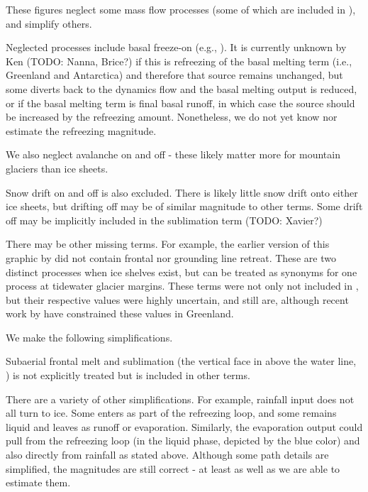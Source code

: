 \documentclass[jog]{igs}
\begin{document}
These figures neglect some mass flow processes (some of which are included in \citet[Fig. 2]{cogley_2011}), and simplify others.

Neglected processes include basal freeze-on (e.g., \citet{bell_2014}). It is currently unknown by Ken (TODO: Nanna,  Brice?) if this is refreezing of the basal melting term (i.e., \citet{karlsson_2021} Greenland and \citet{pattyn_2010} Antarctica) and therefore that source remains unchanged, but some diverts back to the dynamics flow and the basal melting output is reduced, or if the basal melting term is final basal runoff, in which case the source should be increased by the refreezing amount. Nonetheless, we do not yet know nor estimate the refreezing magnitude.

We also neglect avalanche on and off - these likely matter more for mountain glaciers than ice sheets.

Snow drift on and off is also excluded. There is likely little snow drift onto either ice sheets, but drifting off may be of similar magnitude to other terms. Some drift off may be implicitly included in the sublimation term (TODO: Xavier?)

There may be other missing terms. For example, the earlier version of this graphic by \citet[Fig. 2]{cogley_2011} did not contain frontal nor grounding line retreat. These are two distinct processes when ice shelves exist, but can be treated as synonyms for one process at tidewater glacier margins. These terms were not only not included in \citet{cogley_2011}, but their respective values were highly uncertain, and still are, although recent work by \citet{kochtitzky_2023,greene_2024} have constrained these values in Greenland. 

We make the following simplifications.

Subaerial frontal melt and sublimation (the vertical face in above the water line, \citet[Fig. 2]{cogley_2011}) is not explicitly treated but is included in other terms.

There are a variety of other simplifications. For example, rainfall input does not all turn to ice. Some enters as part of the refreezing loop, and some remains liquid and leaves as runoff or evaporation. Similarly, the evaporation output could pull from the refreezing loop (in the liquid phase, depicted by the blue color) and also directly from rainfall as stated above. Although some path details are simplified, the magnitudes are still correct - at least as well as we are able to estimate them.
\end{document}
